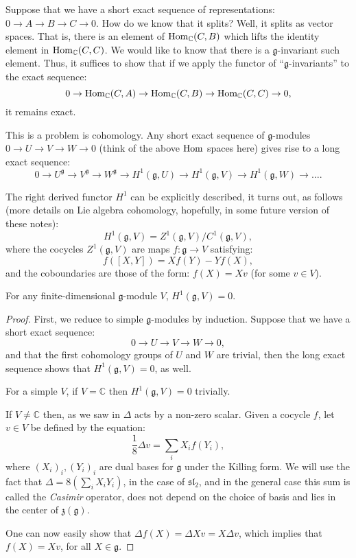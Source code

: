 Suppose that we have a short exact sequence of representations: $0\to A\to B\to C\to 0$. How do we know that it splits? Well, it splits as vector spaces. That is, there is an element of $\mathop{\rm Hom}\nolimits_\mathbb C(C,B)$ which lifts the identity element in $\mathop{\rm Hom}\nolimits_\mathbb C(C,C)$. We would like to know that there is a $\mathfrak g$-invariant such element. Thus, it suffices to show that if we apply the functor of ``$\mathfrak g$-invariants'' to the exact sequence:
$$0\to \mathop{\rm Hom}\nolimits_\mathbb C(C,A)\to \mathop{\rm Hom}\nolimits_\mathbb C(C,B) \to \mathop{\rm Hom}\nolimits_\mathbb C (C,C) \to 0,$$
it remains exact. 

This is a problem is cohomology. Any short exact sequence of $\mathfrak g$-modules $0\to U\to V\to W\to 0$ (think of the above $\mathop{\rm Hom}\nolimits$ spaces here) gives rise to a long exact sequence:
$$0\to U^{\mathfrak g}\to V^{\mathfrak g}\to W^{\mathfrak g}\to H^1(\mathfrak g, U)\to H^1(\mathfrak g, V)\to H^1(\mathfrak g, W)\to \dots.$$

The right derived functor $H^1$ can be explicitly described, it turns out, as follows (more details on Lie algebra cohomology, hopefully, in some future version of these notes):
 $$H^1(\mathfrak g, V) = Z^1(\mathfrak g, V)/C^1(\mathfrak g, V),$$
where the cocycles $Z^1(\mathfrak g, V)$ are maps $f:\mathfrak g\to V$ satisfying:
$$ f([X,Y]) = Xf(Y)-Yf(X),$$
and the coboundaries are those of the form: $f(X)=Xv$ (for some $v\in V$).

\begin{theorem}\label{vanishingcohom}
 For any finite-dimensional $\mathfrak g$-module $V$, $H^1(\mathfrak g,V)=0$.
\end{theorem}

\begin{proof}
 First, we reduce to simple $\mathfrak g$-modules by induction. Suppose that we have a short exact sequence:
$$0\to U\to V\to W\to 0,$$
and that the first cohomology groups of $U$ and $W$ are trivial, then the long exact sequence shows that $H^1(\mathfrak g, V)=0$, as well.

For a simple $V$, if $V=\mathbb C$ then $H^1(\mathfrak g,V)=0$ trivially.

If $V\ne \mathbb C$ then, as we saw in  $\Delta$ acts by a non-zero scalar. Given a cocycle $f$, let $v\in V$ be defined by the equation:
$$\frac{1}{8}\Delta v = \sum_i X_if(Y_i),$$
where $(X_i)_i, (Y_i)_i$ are dual bases for $\mathfrak g$ under the Killing form. We will use the fact that $\Delta = 8(\sum_i X_i Y_i)$, in the case of $\mathfrak{sl}_2$, and in the general case this sum is called the \emph{Casimir} operator, does not depend on the choice of basis and lies in the center of $\mathfrak z(\mathfrak g)$.

One can now easily show that $\Delta f(X)= \Delta Xv = X\Delta v$, which implies that $f(X)=Xv$, for all $X\in \mathfrak g$.
\end{proof}

